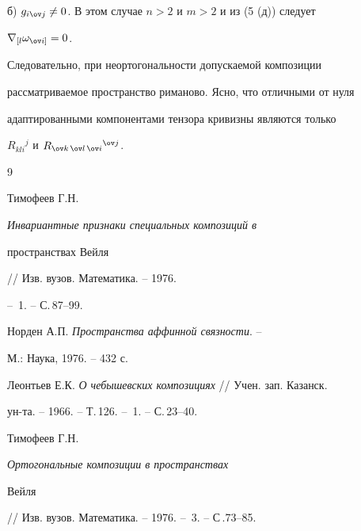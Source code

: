 б) $g_{i\ov j}\ne0$. В этом случае $n>2$ и $m>2$ и из (5 (д)) следует 


$\nabla_{[l}\omega_{\ov i]}=0$. 


Следовательно, при неортогональности допускаемой композиции 


рассматриваемое пространство риманово. Ясно, что отличными от нуля 


адаптированными компонентами тензора кривизны являются только 


$R_{k l i}{}^j$ и $R_{\ov k\,\ov l\,\ov i}{}^{\ov j}$. 


 


\begin{thebibliography}{9} 


 




Тимофеев Г.Н. {\em Инвариантные признаки специальных композиций в 


пространствах Вейля} // Изв. вузов. Математика. -- 1976. 


-- \No\,1. -- С.\,87--99. 




Норден А.П. {\em Пространства аффинной связности}. -- 


М.: Наука, 1976. -- 432 с. 




Леонтьев Е.К. {\em О чебышевских композициях} // Учен. зап. Казанск.


ун-та. -- 1966. -- Т.\,126. -- \No\,1. -- С.\,23--40. 




Тимофеев Г.Н. {\em Ортогональные композиции в пространствах 


Вейля} // Изв. вузов. Математика. -- 1976. -- \No\,3. -- С\,.73--85. 


 


\end{thebibliography} 


 


\vskip 2cm 


 






 


\label{end} 


 


